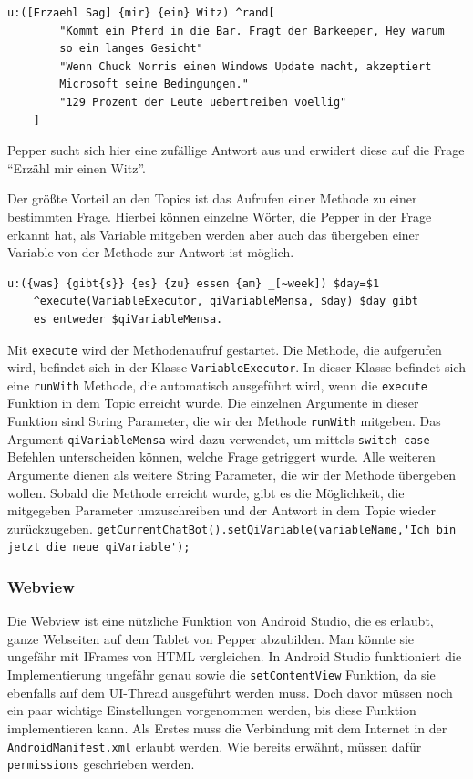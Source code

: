 \begin{lstlisting}[caption={Topic - Zufallsantwort}]
    u:([Erzaehl Sag] {mir} {ein} Witz) ^rand[
        "Kommt ein Pferd in die Bar. Fragt der Barkeeper, Hey warum 
        so ein langes Gesicht"
        "Wenn Chuck Norris einen Windows Update macht, akzeptiert 
        Microsoft seine Bedingungen."
        "129 Prozent der Leute uebertreiben voellig"
    ]
\end{lstlisting}

Pepper sucht sich hier eine zufällige Antwort aus und erwidert diese auf die Frage ``Erzähl mir einen Witz''. 

Der größte Vorteil an den Topics ist das Aufrufen einer Methode zu einer bestimmten Frage. 
Hierbei können einzelne Wörter, die Pepper in der Frage erkannt hat, als Variable mitgeben werden aber auch das übergeben einer Variable von 
der Methode zur Antwort ist möglich.\\

\begin{lstlisting}[caption={Topic - Methodenaufruf}]
    u:({was} {gibt{s}} {es} {zu} essen {am} _[~week]) $day=$1 
    ^execute(VariableExecutor, qiVariableMensa, $day) $day gibt 
    es entweder $qiVariableMensa.
\end{lstlisting}

Mit \verb|execute| wird der Methodenaufruf gestartet. Die Methode, die aufgerufen wird, befindet sich in der Klasse \verb|VariableExecutor|.  In dieser Klasse befindet sich eine \verb|runWith| Methode, die automatisch ausgeführt wird, wenn die \verb|execute| Funktion in dem Topic  erreicht wurde. Die einzelnen Argumente in dieser Funktion sind String Parameter, die wir der Methode \verb|runWith| mitgeben. Das Argument \verb|qiVariableMensa| wird dazu verwendet, um mittels \verb|switch case| Befehlen unterscheiden können, welche Frage getriggert wurde. Alle weiteren Argumente dienen als weitere String Parameter, die wir der Methode übergeben wollen. Sobald die Methode erreicht wurde, gibt es die Möglichkeit, die mitgegeben Parameter umzuschreiben und der Antwort in dem Topic wieder zurückzugeben. \verb|getCurrentChatBot().setQiVariable(variableName,'Ich bin jetzt die neue qiVariable');|%

\subsubsection{Webview}

Die Webview ist eine nützliche Funktion von Android Studio, die es erlaubt, ganze Webseiten auf dem Tablet von Pepper abzubilden. Man könnte sie ungefähr mit IFrames von HTML vergleichen. In Android Studio funktioniert die Implementierung ungefähr genau sowie die \verb|setContentView| Funktion, da sie ebenfalls auf dem UI-Thread ausgeführt werden muss. Doch davor müssen noch ein paar wichtige Einstellungen vorgenommen werden, bis diese Funktion implementieren kann. Als Erstes muss die Verbindung mit dem Internet in der \verb|AndroidManifest.xml| erlaubt werden. Wie bereits erwähnt, müssen dafür \verb|permissions| geschrieben werden. \\

